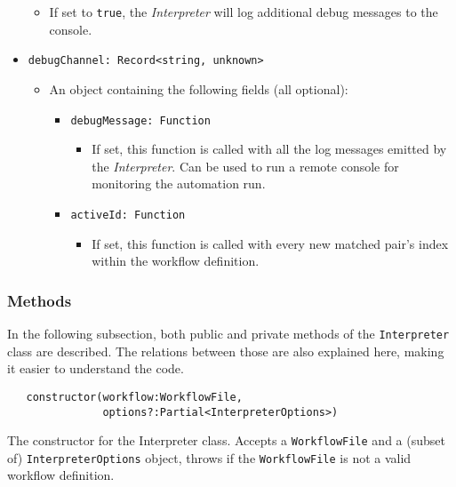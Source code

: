 \begin{itemize}
   \begin{itemize}
      \item If set to \texttt{true}, the \textit{Interpreter} will log additional debug messages to the console.
   \end{itemize}
   \item \texttt{debugChannel: Record<string, unknown>}
   \begin{itemize}
      \item An object containing the following fields (all optional):
      \begin{itemize}
         \item \texttt{debugMessage: Function}
         \begin{itemize}
            \item If set, this function is called with all the log messages emitted by the \textit{Interpreter}.
            Can be used to run a remote console for monitoring the automation run.
         \end{itemize}
         \item \texttt{activeId: Function}
         \begin{itemize}
            \item If set, this function is called with every new matched pair's index within the workflow definition.
         \end{itemize}
      \end{itemize}
   \end{itemize}
\end{itemize}



\subsubsection{Methods}

In the following subsection, both public and private methods of the \texttt{Interpreter} class are described.
The relations between those are also explained here, making it easier to understand the code.

\emptyline
\begin{verbatim}
   constructor(workflow:WorkflowFile, 
               options?:Partial<InterpreterOptions>)
\end{verbatim}

The constructor for the Interpreter class.
Accepts a \texttt{WorkflowFile} and a (subset of) \texttt{InterpreterOptions} object,
throws if the \texttt{WorkflowFile} is not a valid workflow definition.

